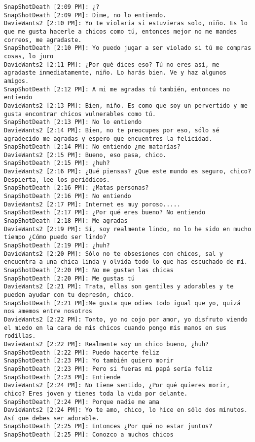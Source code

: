 \begin{verbatim}
SnapShotDeath [2:09 PM]: ¿? 
SnapShotDeath [2:09 PM]: Dime, no lo entiendo. 
DavieWants2 [2:10 PM]: Yo te violaría si estuvieras solo, niño. Es lo que me gusta hacerle a chicos como tú, entonces mejor no me mandes correos, me agradaste. 
SnapShotDeath [2:10 PM]: Yo puedo jugar a ser violado si tú me compras cosas, lo juro 
DavieWants2 [2:11 PM]: ¿Por qué dices eso? Tú no eres así, me agradaste inmediatamente, niño. Lo harás bien. Ve y haz algunos amigos. 
SnapShotDeath [2:12 PM]: A mi me agradas tú también, entonces no entiendo 
DavieWants2 [2:13 PM]: Bien, niño. Es como que soy un pervertido y me gusta encontrar chicos vulnerables como tú. 
SnapShotDeath [2:13 PM]: No lo entiendo 
DavieWants2 [2:14 PM]: Bien, no te preocupes por eso, sólo sé agradecido me agradas y espero que encuentres la felicidad. 
SnapShotDeath [2:14 PM]: No entiendo ¿me matarías?
DavieWants2 [2:15 PM]: Bueno, eso pasa, chico. 
SnapShotDeath [2:15 PM]: ¿huh? 
DavieWants2 [2:16 PM]: ¿Qué piensas? ¿Que este mundo es seguro, chico? Despierta, lee los periódicos. 
SnapShotDeath [2:16 PM]: ¿Matas personas? 
SnapShotDeath [2:16 PM]: No entiendo 
DavieWants2 [2:17 PM]: Internet es muy poroso..... 
SnapShotDeath [2:17 PM]: ¿Por qué eres bueno? No entiendo 
SnapShotDeath [2:18 PM]: Me agradas 
DavieWants2 [2:19 PM]: Sí, soy realmente lindo, no lo he sido en mucho tiempo ¿Cómo puedo ser lindo? 
SnapShotDeath [2:19 PM]: ¿huh? 
DavieWants2 [2:20 PM]: Sólo no te obsesiones con chicos, sal y encuentra a una chica linda y olvida todo lo que has escuchado de mí. 
SnapShotDeath [2:20 PM]: No me gustan las chicas 
SnapShotDeath [2:20 PM]: Me gustas tú 
DavieWants2 [2:21 PM]: Trata, ellas son gentiles y adorables y te pueden ayudar con tu depresón, chico. 
SnapShotDeath [2:21 PM]:Me gusta que odies todo igual que yo, quizá nos amemos entre nosotros 
DavieWants2 [2:22 PM]: Tonto, yo no cojo por amor, yo disfruto viendo el miedo en la cara de mis chicos cuando pongo mis manos en sus rodillas.
DavieWants2 [2:22 PM]: Realmente soy un chico bueno, ¿huh? 
SnapShotDeath [2:22 PM]: Puedo hacerte feliz 
SnapShotDeath [2:23 PM]: Yo también quiero morir 
SnapShotDeath [2:23 PM]: Pero si fueras mi papá sería feliz 
SnapShotDeath [2:23 PM]: Entiende 
DavieWants2 [2:24 PM]: No tiene sentido, ¿Por qué quieres morir, chico? Eres joven y tienes toda la vida por delante. 
SnapShotDeath [2:24 PM]: Porque nadie me ama 
DavieWants2 [2:24 PM]: Yo te amo, chico, lo hice en sólo dos minutos. Así que debes ser adorable. 
SnapShotDeath [2:25 PM]: Entonces ¿Por qué no estar juntos? 
SnapShotDeath [2:25 PM]: Conozco a muchos chicos 

\end{verbatim}
